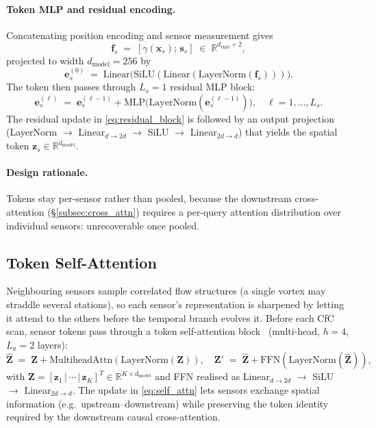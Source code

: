 \paragraph{Token MLP and residual encoding.}
Concatenating position encoding and sensor measurement gives
\begin{equation*}
    \mathbf{f}_s \;=\; [\gamma(\mathbf{x}_s);\,\mathbf{s}_s] \;\in\;\mathbb{R}^{d_{\text{emb}}+2},
\end{equation*}
projected to width $d_{\text{model}} = 256$ by
\begin{equation*}
    \mathbf{e}_s^{(0)} \;=\; \mathrm{Linear}\!\big(\mathrm{SiLU}(\mathrm{Linear}(\mathrm{LayerNorm}(\mathbf{f}_s)))\big).
\end{equation*}
The token then passes through $L_s = 1$ residual MLP block:
\begin{equation}
    \label{eq:residual_block}
    \mathbf{e}_s^{(\ell)} \;=\; \mathbf{e}_s^{(\ell-1)} + \mathrm{MLP}\!\big(\mathrm{LayerNorm}(\mathbf{e}_s^{(\ell-1)})\big),\quad \ell=1,\ldots,L_s.
\end{equation}
The residual update in \eqref{eq:residual_block} is followed by an output projection (LayerNorm $\to$ Linear$_{d\to 2d}$ $\to$ SiLU $\to$ Linear$_{2d\to d}$) that yields the spatial token $\mathbf{z}_s \in \mathbb{R}^{d_{\text{model}}}$.

\paragraph{Design rationale.}
Tokens stay per-sensor rather than pooled, because the downstream cross-attention (\S\ref{subsec:cross_attn}) requires a per-query attention distribution over individual sensors: unrecoverable once pooled.

\subsection{Token Self-Attention}
\label{subsec:token_attn}

Neighbouring sensors sample correlated flow structures (a single vortex may straddle several stations), so each sensor's representation is sharpened by letting it attend to the others before the temporal branch evolves it. Before each CfC scan, sensor tokens pass through a token self-attention block~\cite{Vaswani2017Attention} (multi-head, $h=4$, $L_a=2$ layers):
\begin{equation}
    \label{eq:self_attn}
    \hat{\mathbf{Z}} \;=\; \mathbf{Z} + \mathrm{MultiheadAttn}(\mathrm{LayerNorm}(\mathbf{Z})),
    \quad \mathbf{Z}' \;=\; \hat{\mathbf{Z}} + \mathrm{FFN}(\mathrm{LayerNorm}(\hat{\mathbf{Z}})),
\end{equation}
with $\mathbf{Z} = [\mathbf{z}_1\,|\,\cdots\,|\,\mathbf{z}_K]^T \in\mathbb{R}^{K\times d_{\text{model}}}$ and FFN realised as Linear$_{d\to 2d}$ $\to$ SiLU $\to$ Linear$_{2d\to d}$. The update in \eqref{eq:self_attn} lets sensors exchange spatial information (e.g.\ upstream--downstream) while preserving the token identity required by the downstream causal cross-attention.


